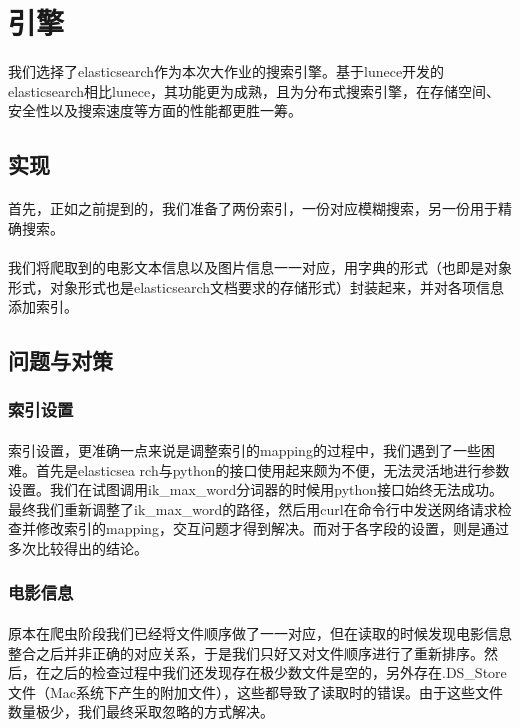 \documentclass[main.tex]{subfiles}
\begin{document}
\section{引擎}
\paragraph{} 我们选择了elasticsearch作为本次大作业的搜索引擎。基于lunece开发的elasticsearch相比lunece，其功能更为成熟，且为分布式搜索引擎，在存储空间、安全性以及搜索速度等方面的性能都更胜一筹。
\subsection{实现}
\paragraph{} 首先，正如之前提到的，我们准备了两份索引，一份对应模糊搜索，另一份用于精确搜索。
\paragraph{} 我们将爬取到的电影文本信息以及图片信息一一对应，用字典的形式（也即是对象形式，对象形式也是elasticsearch文档要求的存储形式）封装起来，并对各项信息添加索引。
\subsection{问题与对策}
\subsubsection{索引设置}
\paragraph{} 索引设置，更准确一点来说是调整索引的mapping的过程中，我们遇到了一些困难。首先是elasticsea
rch与python的接口使用起来颇为不便，无法灵活地进行参数设置。我们在试图调用ik\_max\_word分词器的时候用python接口始终无法成功。最终我们重新调整了ik\_max\_word的路径，然后用curl在命令行中发送网络请求检查并修改索引的mapping，交互问题才得到解决。而对于各字段的设置，则是通过多次比较得出的结论。
\subsubsection{电影信息}
\paragraph{} 原本在爬虫阶段我们已经将文件顺序做了一一对应，但在读取的时候发现电影信息整合之后并非正确的对应关系，于是我们只好又对文件顺序进行了重新排序。然后，在之后的检查过程中我们还发现存在极少数文件是空的，另外存在.DS\_Store文件（Mac系统下产生的附加文件），这些都导致了读取时的错误。由于这些文件数量极少，我们最终采取忽略的方式解决。
	
	
\end{document}
